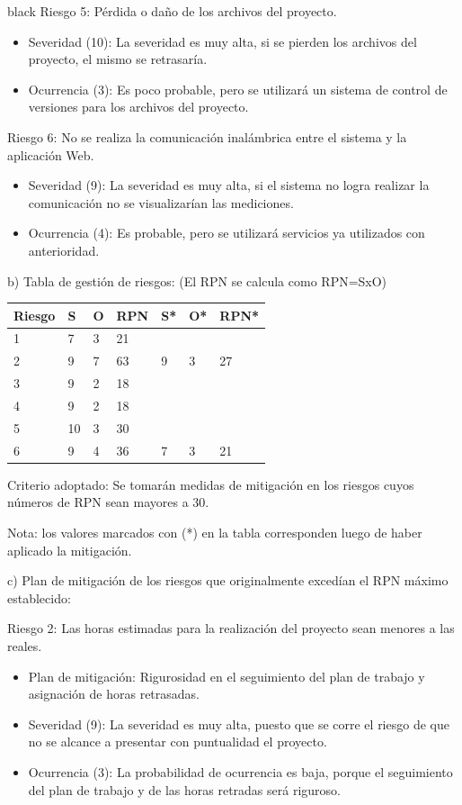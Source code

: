 \documentclass[11pt]{charter}
\begin{document}
\begin{consigna}{black}
Riesgo 5: Pérdida o daño de los archivos del proyecto.
\begin{itemize}
\item Severidad (10): La severidad es muy alta, si se pierden los archivos del proyecto, el mismo se retrasaría.
\item Ocurrencia (3): Es poco probable, pero se utilizará un sistema de control de versiones para los archivos del proyecto.
\end{itemize}

Riesgo 6: No se realiza la comunicación inalámbrica entre el sistema y la aplicación Web.
\begin{itemize}
\item Severidad (9): La severidad es muy alta, si el sistema no logra realizar la comunicación no se visualizarían las mediciones.
\item Ocurrencia (4): Es probable, pero se utilizará servicios ya utilizados con anterioridad.
\end{itemize}

b) Tabla de gestión de riesgos:      (El RPN se calcula como RPN=SxO)
\begin{table}[htpb]
\centering
\begin{tabularx}{\linewidth}{@{}|X|X|X|X|X|X|X|@{}}
\hline
\rowcolor[HTML]{C0C0C0} 
Riesgo & S & O & RPN & S* & O* & RPN* \\ \hline
   1  & 7 & 3 & 21  &    &    &      \\ \hline
   2   & 9 & 7 & 63  &  9 & 3  & 27   \\ \hline
   3   & 9 & 2 & 18  &    &    &      \\ \hline
   4   & 9 & 2 & 18  &    &    &      \\ \hline
   5   & 10 & 3 & 30 &    &    &      \\ \hline
   6   & 9 & 4 & 36  &  7 & 3  & 21    \\ \hline
\end{tabularx}%
\end{table}

Criterio adoptado: 
Se tomarán medidas de mitigación en los riesgos cuyos números de RPN sean mayores a 30.

Nota: los valores marcados con (*) en la tabla corresponden luego de haber aplicado la mitigación.

c) Plan de mitigación de los riesgos que originalmente excedían el RPN máximo establecido:
 
Riesgo 2: Las horas estimadas para la realización del proyecto sean menores a las reales.
\begin{itemize}
\item Plan de mitigación: Rigurosidad en el seguimiento del plan de trabajo y asignación de horas retrasadas. 
\item Severidad (9): La severidad es muy alta, puesto que se corre el riesgo de que no se alcance a presentar con puntualidad el proyecto. 
\item Ocurrencia (3): La probabilidad de ocurrencia es baja, porque el seguimiento del plan de trabajo y de las horas retradas será riguroso. 
\end{itemize}


\end{consigna}
\end{document}
